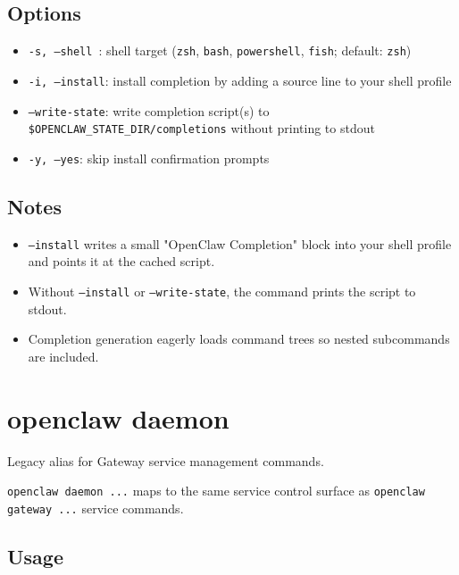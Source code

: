 \subsection{Options}


\begin{itemize}
  \item \texttt{-s, --shell }: shell target (\texttt{zsh}, \texttt{bash}, \texttt{powershell}, \texttt{fish}; default: \texttt{zsh})
  \item \texttt{-i, --install}: install completion by adding a source line to your shell profile
  \item \texttt{--write-state}: write completion script(s) to \texttt{\$OPENCLAW\_STATE\_DIR/completions} without printing to stdout
  \item \texttt{-y, --yes}: skip install confirmation prompts
\end{itemize}


\subsection{Notes}


\begin{itemize}
  \item \texttt{--install} writes a small "OpenClaw Completion" block into your shell profile and points it at the cached script.
  \item Without \texttt{--install} or \texttt{--write-state}, the command prints the script to stdout.
  \item Completion generation eagerly loads command trees so nested subcommands are included.
\end{itemize}



\clearpage

\section{openclaw daemon}


Legacy alias for Gateway service management commands.

\texttt{openclaw daemon ...} maps to the same service control surface as \texttt{openclaw gateway ...} service commands.

\subsection{Usage}


